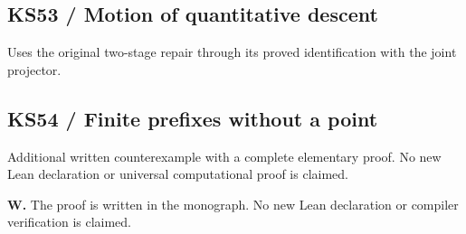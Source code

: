 \par\noindent\begin{minipage}{\linewidth}\subsection*{KS53 / Motion of quantitative descent}
Uses the original two-stage repair through its proved identification with the joint projector.
\par\smallskip{}\par
\smallskip\noindent{\color{KomorebiMuted}\rule{\linewidth}{.3pt}}\par\end{minipage}\par\medskip
\par\noindent\begin{minipage}{\linewidth}\subsection*{KS54 / Finite prefixes without a point}
Additional written counterexample with a complete elementary proof. No new Lean declaration or universal computational proof is claimed.
\par\smallskip\noindent\textbf{W.} The proof is written in the monograph. No new Lean declaration or compiler verification is claimed.
\smallskip\noindent{\color{KomorebiMuted}\rule{\linewidth}{.3pt}}\par\end{minipage}\par\medskip
